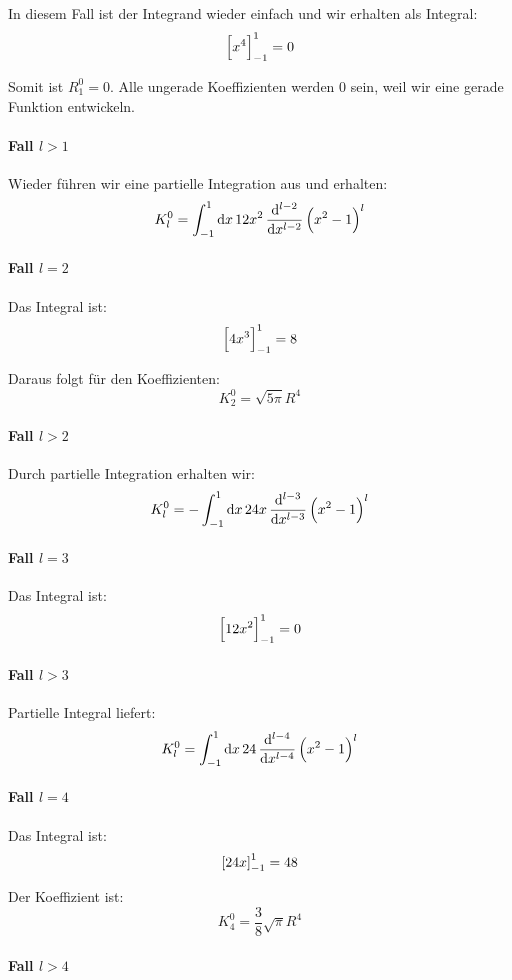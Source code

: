 \documentclass[11pt, ngerman, fleqn]{article}
\begin{document}
In diesem Fall ist der Integrand wieder einfach und wir erhalten als Integral:
\[
\sbr{x^4}_{-1}^1 = 0
\]

Somit ist $R_1^0 = 0$. Alle ungerade Koeffizienten werden 0 sein, weil wir eine
gerade Funktion entwickeln.

\paragraph{Fall $l > 1$}

Wieder führen wir eine partielle Integration aus und erhalten:
\[
K_l^0 = \int_{-1}^1 \dif x \, 12 x^2 \dod[l-2]{}x \del{x^2-1}^l
\]

\paragraph{Fall $l = 2$}

Das Integral ist:
\[
\sbr{4x^3}_{-1}^1 = 8
\]

Daraus folgt für den Koeffizienten:
\[
K_2^0 = \sqrt{5 \pi} R^4
\]

\paragraph{Fall $l > 2$}

Durch partielle Integration erhalten wir:
\[
K_l^0 = - \int_{-1}^1 \dif x \, 24 x \dod[l-3]{}x \del{x^2-1}^l
\]

\paragraph{Fall $l = 3$}

Das Integral ist:
\[
\sbr{12 x^2}_{-1}^1 = 0
\]

\paragraph{Fall $l > 3$}

Partielle Integral liefert:
\[
K_l^0 = \int_{-1}^1 \dif x \, 24 \dod[l-4]{}x \del{x^2-1}^l
\]

\paragraph{Fall $l = 4$}

Das Integral ist:
\[
\sbr{24x}_{-1}^1 = 48
\]

Der Koeffizient ist:
\[
K_4^0 = \frac{3}{8} \sqrt{\pi} R^4
\]

\paragraph{Fall $l > 4$}
\end{document}
